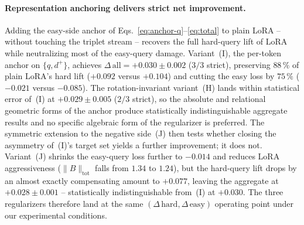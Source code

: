 \paragraph{Representation anchoring delivers strict net improvement.}
Adding the easy-side anchor of Eqs.~\eqref{eq:anchor-q}--\eqref{eq:total} to plain LoRA -- without touching the triplet stream -- recovers the full hard-query lift of LoRA while neutralizing most of the easy-query damage. Variant~(I), the per-token anchor on $\{q, d^+\}$, achieves $\Delta\,\mathrm{all}{=}+0.030\pm 0.002$ ($3/3$ strict), preserving $88\,\%$ of plain LoRA's hard lift ($+0.092$ versus $+0.104$) and cutting the easy loss by $75\,\%$ ($-0.021$ versus $-0.085$). The rotation-invariant variant~(H) lands within statistical error of~(I) at $+0.029\pm 0.005$ ($2/3$ strict), so the absolute and relational geometric forms of the anchor produce statistically indistinguishable aggregate results and no specific algebraic form of the regularizer is preferred. The symmetric extension to the negative side~(J) then tests whether closing the asymmetry of~(I)'s target set yields a further improvement; it does not. Variant~(J) shrinks the easy-query loss further to $-0.014$ and reduces LoRA aggressiveness ($\|B\|_{\text{tot}}$ falls from $1.34$ to $1.24$), but the hard-query lift drops by an almost exactly compensating amount to $+0.077$, leaving the aggregate at $+0.028\pm 0.001$ -- statistically indistinguishable from~(I) at $+0.030$. The three regularizers therefore land at the same $(\Delta\,\mathrm{hard}, \Delta\,\mathrm{easy})$ operating point under our experimental conditions.

